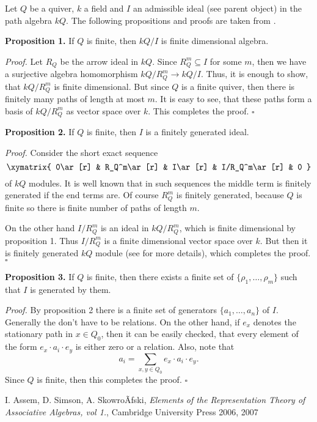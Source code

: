 \documentclass[12pt]{article}
\begin{document}
Let $Q$ be a quiver, $k$ a field and $I$ an admissible ideal (see parent object) in the path algebra $kQ$. The following propositions and proofs are taken from \cite{ASS}.

\textbf{Proposition 1.} If $Q$ is finite, then $kQ/I$ is finite dimensional algebra.

\textit{Proof.} Let $R_Q$ be the arrow ideal in $kQ$. Since $R_Q^m\subseteq I$ for some $m$, then we have a surjective algebra homomorphism $kQ/R_Q^m\to kQ/I$. Thus, it is enough to show, that $kQ/R_Q^m$ is finite dimensional. But since $Q$ is a finite quiver, then there is finitely many paths of length at most $m$. It is easy to see, that these paths form a basis of $kQ/R_Q^m$ as vector space over $k$. This completes the proof. $\square$

\textbf{Proposition 2.} If $Q$ is finite, then $I$ is a finitely generated ideal.

\textit{Proof.} Consider the short exact sequence
$$\xymatrix{
0\ar[r] & R_Q^m\ar[r] & I\ar[r] & I/R_Q^m\ar[r] & 0
}$$
of $kQ$ modules. It is well known that in such sequences the middle term is finitely generated if the end terms are. Of course $R_Q^m$ is finitely generated, because $Q$ is finite so there is finite number of paths of length $m$. 

On the other hand $I/R_Q^m$ is an ideal in $kQ/R_Q^m$, which is finite dimensional by proposition 1. Thus $I/R_Q^m$ is a finite dimensional vector space over $k$. But then it is finitely generated $kQ$ module (see  for more details), which completes the proof. $\square$

\textbf{Proposition 3.} If $Q$ is finite, then there exists a finite set of  $\{\rho_1,\ldots,\rho_m\}$ such that $I$ is generated by them.

\textit{Proof.} By proposition 2 there is a finite set of generators $\{a_1,\ldots,a_n\}$ of $I$. Generally the don't have to be relations. On the other hand, if $e_x$ denotes the stationary path in $x\in Q_0$, then it can be easily checked, that every element of the form $e_x\cdot a_i\cdot e_y$ is either zero or a relation. Also, note that 
$$a_i=\sum_{x,y\in Q_0}e_x\cdot a_i\cdot e_y.$$
Since $Q$ is finite, then this completes the proof. $\square$


\begin{thebibliography}{99}
 I. Assem, D. Simson, A. SkowroÃƒski, \textit{Elements of the Representation Theory of Associative Algebras, vol 1.}, Cambridge University Press 2006, 2007
\end{thebibliography}

\end{document}
